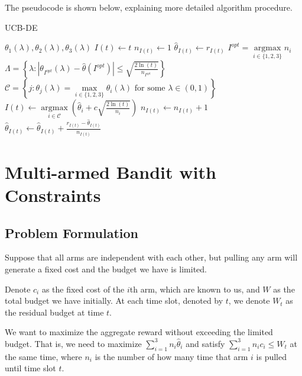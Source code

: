 \documentclass[11pt]{article}
\begin{document}
The pseudocode is shown below, explaining more detailed algorithm
procedure.

\begin{algorithm}
\caption{UCB-DE}
\begin{algorithmic}[1]
    \Require $\theta_1(\lambda),\theta_2(\lambda),\theta_3(\lambda)$
    \State $I(t)\gets t$
    \State $n_{I(t)}\gets 1$
    \State $\hat{\theta}_{I(t)}\gets r_{I(t)}$
    \EndFor
    \State $I^{opt}=\mathop{\arg\max}\limits_{i\in\{1,2,3\}}n_i$
    \State $\Lambda=\left\{\lambda:|\theta_{I^{opt}}(\lambda)-\hat{\theta}({I^{opt}})|\leqslant\sqrt{\frac{2\ln(t)}{n_{I^{opt}}}}\right\}$
    \State $\mathcal{C}=\left\{j:\theta_j(\lambda)=\max\limits_{i\in\{1,2,3\}}\theta_i(\lambda)\text{ for some }\lambda\in(0,1)\right\}$
    \State $I(t)\gets\mathop{\arg\max}\limits_{i\in\mathcal{C}}\left(\hat{\theta}_i+c\sqrt{\frac{2\ln(t)}{n_i}}\right)$
    \State $n_{I(t)}\gets n_{I(t)}+1$
    \State $\hat{\theta}_{I(t)}\gets\hat{\theta}_{I(t)}+\frac{r_{I(t)}-\hat{\theta}_{I(t)}}{n_{I(t)}}$
    \EndFor
\end{algorithmic}
\end{algorithm}

    \hypertarget{multi-armed-bandit-with-constraints}{%
\section{Multi-armed Bandit with
Constraints}\label{multi-armed-bandit-with-constraints}}

\hypertarget{problem-formulation}{%
\subsection{Problem Formulation}\label{problem-formulation}}

Suppose that all arms are independent with each other, but pulling any
arm will generate a fixed cost and the budget we have is limited.

Denote \(c_i\) as the fixed cost of the \(i\)th arm, which are known to
us, and \(W\) as the total budget we have initially. At each time slot,
denoted by \(t\), we denote \(W_t\) as the residual budget at time
\(t\).

We want to maximize the aggregate reward without exceeding the limited
budget. That is, we need to maximize
\(\sum\limits_{i=1}^3n_i\hat{\theta}_i\) and satisfy
\(\sum\limits_{i=1}^3n_ic_i\leqslant W_t\) at the same time, where
\(n_i\) is the number of how many time that arm \(i\) is pulled until
time slot \(t\).
\end{document}
